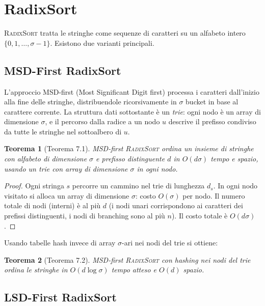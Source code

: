 \documentclass[12pt, a4paper, oneside]{book}
\theoremstyle{plain}
\newtheorem{teorema}{Teorema}[chapter]
\theoremstyle{definition}
\theoremstyle{remark}
\begin{document}
\section{RadixSort}

\textsc{RadixSort} tratta le stringhe come sequenze di caratteri su un alfabeto intero $\{0, 1, \ldots, \sigma - 1\}$. Esistono due varianti principali.

\subsection{MSD-First RadixSort}

L'approccio MSD-first (Most Significant Digit first) processa i caratteri dall'inizio alla fine delle stringhe, distribuendole ricorsivamente in $\sigma$ bucket in base al carattere corrente. La struttura dati sottostante è un \emph{trie}: ogni nodo è un array di dimensione $\sigma$, e il percorso dalla radice a un nodo $u$ descrive il prefisso condiviso da tutte le stringhe nel sottoalbero di $u$.

\begin{teorema}[Teorema 7.1]
MSD-first \textsc{RadixSort} ordina un insieme di stringhe con alfabeto di dimensione $\sigma$ e prefisso distinguente $d$ in $O(d\sigma)$ tempo e spazio, usando un trie con array di dimensione $\sigma$ in ogni nodo.
\end{teorema}

\begin{proof}
Ogni stringa $s$ percorre un cammino nel trie di lunghezza $d_s$. In ogni nodo visitato si alloca un array di dimensione $\sigma$: costo $O(\sigma)$ per nodo. Il numero totale di nodi (interni) è al più $d$ (i nodi unari corrispondono ai caratteri dei prefissi distinguenti, i nodi di branching sono al più $n$). Il costo totale è $O(d\sigma)$.
\end{proof}

Usando tabelle hash invece di array $\sigma$-ari nei nodi del trie si ottiene:

\begin{teorema}[Teorema 7.2]
MSD-first \textsc{RadixSort} con hashing nei nodi del trie ordina le stringhe in $O(d\log\sigma)$ tempo atteso e $O(d)$ spazio.
\end{teorema}

\subsection{LSD-First RadixSort}
\end{document}
